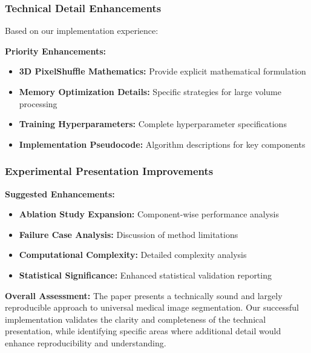 \subsubsection*{Technical Detail Enhancements}
Based on our implementation experience:

\textbf{Priority Enhancements:}
\begin{itemize}
    \item \textbf{3D PixelShuffle Mathematics:} Provide explicit mathematical formulation
    \item \textbf{Memory Optimization Details:} Specific strategies for large volume processing
    \item \textbf{Training Hyperparameters:} Complete hyperparameter specifications
    \item \textbf{Implementation Pseudocode:} Algorithm descriptions for key components
\end{itemize}

\subsubsection*{Experimental Presentation Improvements}
\textbf{Suggested Enhancements:}
\begin{itemize}
    \item \textbf{Ablation Study Expansion:} Component-wise performance analysis
    \item \textbf{Failure Case Analysis:} Discussion of method limitations
    \item \textbf{Computational Complexity:} Detailed complexity analysis
    \item \textbf{Statistical Significance:} Enhanced statistical validation reporting
\end{itemize}

\textbf{Overall Assessment:} The paper presents a technically sound and largely reproducible approach to universal medical image segmentation. Our successful implementation validates the clarity and completeness of the technical presentation, while identifying specific areas where additional detail would enhance reproducibility and understanding.
